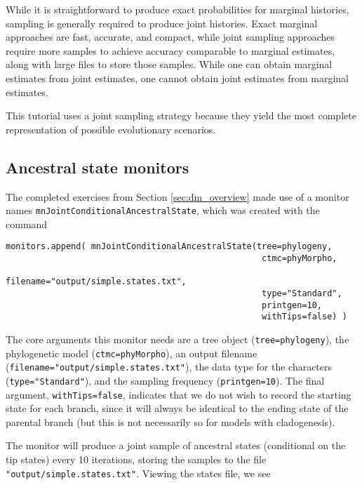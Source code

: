 While it is straightforward to produce exact probabilities for marginal histories, sampling is generally required to produce joint histories.
Exact marginal approaches are fast, accurate, and compact, while joint sampling approaches require more samples to achieve accuracy comparable to marginal estimates, along with large files to store those samples.
While one can obtain marginal estimates from joint estimates, one cannot obtain joint estimates from marginal estimates.

This tutorial uses a joint sampling strategy because they yield the most complete representation of possible evolutionary scenarios.

\subsection{Ancestral state monitors}

The completed exercises from Section \ref{sec:dm_overview} made use of a monitor names {\tt mnJointConditionalAncestralState}, which was created with the command

{\tt \begin{snugshade*}
\begin{lstlisting}
monitors.append( mnJointConditionalAncestralState(tree=phylogeny,
                                                   ctmc=phyMorpho,
                                                   filename="output/simple.states.txt",
                                                   type="Standard",
                                                   printgen=10,
                                                   withTips=false) )
\end{lstlisting}
\end{snugshade*}}

The core arguments this monitor needs are a tree object ({\tt tree=phylogeny}), the phylogenetic model ({\tt ctmc=phyMorpho}), an output filename ({\tt filename="output/simple.states.txt"}), the data type for the characters ({\tt type="Standard"}), and the sampling frequency ({\tt printgen=10}).
The final argument, {\tt withTips=false}, indicates that we do not wish to record the starting state for each branch, since it will always be identical to the ending state of the parental branch (but this is not necessarily so for models with cladogenesis).

The monitor will produce a joint sample of ancestral states (conditional on the tip states) every 10 iterations, storing the samples to the file {\tt "output/simple.states.txt"}.
Viewing the states file, we see

